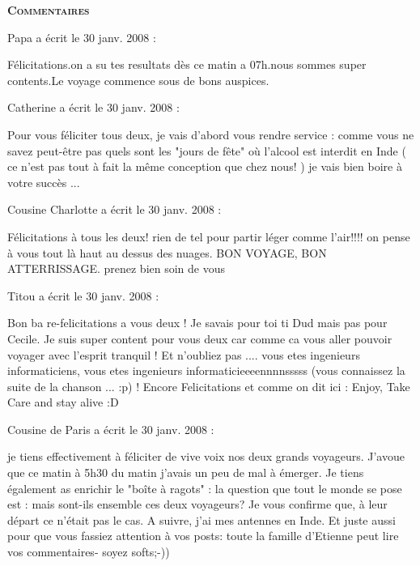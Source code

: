 \bigskip
\textbf{\textsc{Commentaires}}

\medskip
Papa a écrit le 30 janv. 2008 :
\begin{displayquote}
Félicitations.on a su tes resultats dès ce matin a 07h.nous sommes super contents.Le voyage commence sous de bons auspices.
\end{displayquote}

\medskip
Catherine a écrit le 30 janv. 2008 :
\begin{displayquote}
Pour vous féliciter tous deux, je vais d'abord vous rendre service : comme vous ne savez peut-être pas quels sont les "jours de fête" où l'alcool est interdit en Inde ( ce n'est pas tout à fait la même conception que chez nous! ) je vais bien boire à votre succès ...
\end{displayquote}

\medskip
Cousine Charlotte a écrit le 30 janv. 2008 :
\begin{displayquote}
Félicitations à tous les deux! rien de tel pour partir léger comme l'air!!!! on pense à vous tout là haut au dessus des nuages. BON VOYAGE, BON ATTERRISSAGE. prenez bien soin de vous
\end{displayquote}

\medskip
Titou a écrit le 30 janv. 2008 :
\begin{displayquote}
Bon ba re-felicitations a vous deux ! Je savais pour toi ti Dud mais pas pour Cecile. Je suis super content pour vous deux car comme ca vous aller pouvoir voyager avec l'esprit tranquil ! Et n'oubliez pas .... vous etes ingenieurs informaticiens, vous etes ingenieurs informaticieeeennnnsssss (vous connaissez la suite de la chanson ... :p) ! Encore Felicitations et comme on dit ici : Enjoy, Take Care and stay alive :D
\end{displayquote}

\medskip
Cousine de Paris a écrit le 30 janv. 2008 :
\begin{displayquote}
je tiens effectivement à féliciter de vive voix nos deux grands voyageurs. J'avoue que ce matin à 5h30 du matin j'avais un peu de mal à émerger.
Je tiens également as enrichir le "boîte à ragots" : la question que tout le monde se pose est : mais sont-ils ensemble ces deux voyageurs? Je vous confirme que, à leur départ ce n'était pas le cas. A suivre, j'ai mes antennes en Inde.
Et juste aussi pour que vous fassiez attention à vos posts: toute la famille d'Etienne peut lire vos commentaires- soyez softs;-))
\end{displayquote}

